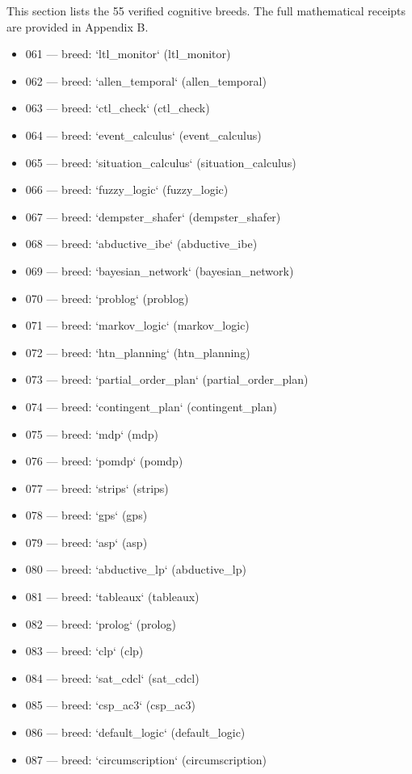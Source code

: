 This section lists the 55 verified cognitive breeds. The full mathematical receipts are provided in Appendix B.

\begin{itemize}
  \item 061 — breed: `ltl\_monitor` (ltl\_monitor)
  \item 062 — breed: `allen\_temporal` (allen\_temporal)
  \item 063 — breed: `ctl\_check` (ctl\_check)
  \item 064 — breed: `event\_calculus` (event\_calculus)
  \item 065 — breed: `situation\_calculus` (situation\_calculus)
  \item 066 — breed: `fuzzy\_logic` (fuzzy\_logic)
  \item 067 — breed: `dempster\_shafer` (dempster\_shafer)
  \item 068 — breed: `abductive\_ibe` (abductive\_ibe)
  \item 069 — breed: `bayesian\_network` (bayesian\_network)
  \item 070 — breed: `problog` (problog)
  \item 071 — breed: `markov\_logic` (markov\_logic)
  \item 072 — breed: `htn\_planning` (htn\_planning)
  \item 073 — breed: `partial\_order\_plan` (partial\_order\_plan)
  \item 074 — breed: `contingent\_plan` (contingent\_plan)
  \item 075 — breed: `mdp` (mdp)
  \item 076 — breed: `pomdp` (pomdp)
  \item 077 — breed: `strips` (strips)
  \item 078 — breed: `gps` (gps)
  \item 079 — breed: `asp` (asp)
  \item 080 — breed: `abductive\_lp` (abductive\_lp)
  \item 081 — breed: `tableaux` (tableaux)
  \item 082 — breed: `prolog` (prolog)
  \item 083 — breed: `clp` (clp)
  \item 084 — breed: `sat\_cdcl` (sat\_cdcl)
  \item 085 — breed: `csp\_ac3` (csp\_ac3)
  \item 086 — breed: `default\_logic` (default\_logic)
  \item 087 — breed: `circumscription` (circumscription)

\end{itemize}
